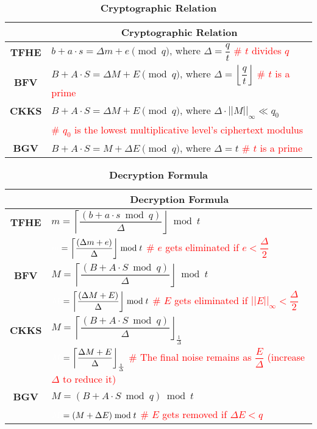 \begin{table}[h]
\begin{tabular}{|c||l|}
\hline
&\multicolumn{1}{c|}{\textbf{Cryptographic Relation}}\\\hline\hline
\textbf{TFHE}&$b + a\cdot s = \Delta m + e \pmod q$, \text{ } where $\Delta = \dfrac{q}{t}$  \text{ } \textcolor{red}{\# $t$ divides $q$}\\\hline
\textbf{BFV}&$B + A\cdot S = \Delta M + E \pmod q$, \text{ } where $\Delta = \left\lfloor\dfrac{q}{t}\right\rfloor$ \text{ } \textcolor{red}{\# $t$ is a prime}\\\hline
\textbf{CKKS}&$B + A\cdot S = \Delta M + E \pmod q$, \text{ } where $\Delta \cdot ||M||_\infty \ll q_0$\\
& \text{ } \textcolor{red}{\# $q_0$ is the lowest multiplicative level's ciphertext modulus}\\\hline
\textbf{BGV}&$B + A\cdot S = M + \Delta E \pmod q$, \text{ } where $\Delta = t$  \text{ } \textcolor{red}{\# $t$ is a prime}\\\hline
\end{tabular}
\caption{\textbf{Cryptographic Relation}}
\end{table}


\begin{table}[h]
\begin{tabular}{|c||l|}
\hline
&\multicolumn{1}{c|}{\textbf{Decryption Formula}}\\\hline\hline
\textbf{TFHE}&$m = \left\lceil\dfrac{(b + a\cdot s \bmod q)}{\Delta}\right\rfloor \bmod t$\\
&$\textcolor{white}{m} = \left\lceil\dfrac{(\Delta m + e)}{\Delta}\right\rfloor \bmod t$ \text{ } \textcolor{red}{ \# $e$ gets eliminated if $e < \dfrac{\Delta}{2}$}\\\hline
\textbf{BFV}&$M = \left\lceil\dfrac{(B + A\cdot S \bmod q)}{\Delta}\right\rfloor  \bmod t$\\
&$\textcolor{white}{M} = \left\lceil\dfrac{(\Delta M + E)}{\Delta}\right\rfloor  \bmod t$ \text{ } \textcolor{red}{ \# $E$ gets eliminated if $||E||_\infty < \dfrac{\Delta}{2}$}\\\hline
\textbf{CKKS}&$M = \left\lceil\dfrac{(B + A\cdot S \bmod q)}{\Delta}\right\rfloor_{\frac{1}{\Delta}}$\\
&$\textcolor{white}{M} = \left\lceil\dfrac{\Delta M + E}{\Delta}\right\rfloor_{\frac{1}{\Delta}}$ \text{ } \textcolor{red}{ \# The final noise remains as $\dfrac{E}{\Delta}$ (increase $\Delta$ to reduce it)}\\\hline
\textbf{BGV}&$M = (B + A\cdot S \bmod q) \bmod t$\\
&$\textcolor{white}{M} = (M + \Delta E) \bmod t$ \text{ } \textcolor{red}{ \# $E$ gets removed if $\Delta E < q$}\\\hline
\end{tabular}
\caption{\textbf{Decryption Formula}}
\end{table}

